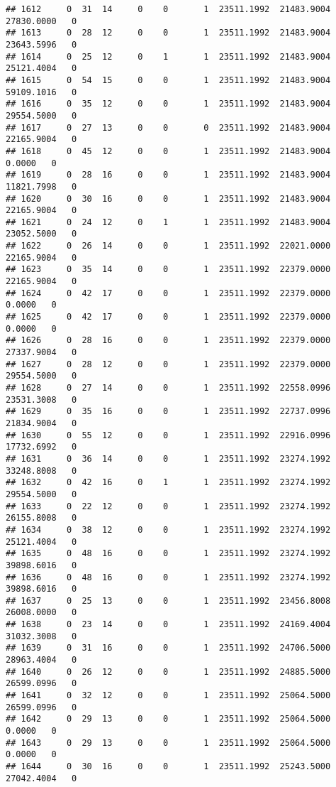 \documentclass[
]{article}
\begin{document}
\begin{enumerate}
\begin{verbatim}
## 1612     0  31  14     0    0       1  23511.1992  21483.9004  27830.0000   0
## 1613     0  28  12     0    0       1  23511.1992  21483.9004  23643.5996   0
## 1614     0  25  12     0    1       1  23511.1992  21483.9004  25121.4004   0
## 1615     0  54  15     0    0       1  23511.1992  21483.9004  59109.1016   0
## 1616     0  35  12     0    0       1  23511.1992  21483.9004  29554.5000   0
## 1617     0  27  13     0    0       0  23511.1992  21483.9004  22165.9004   0
## 1618     0  45  12     0    0       1  23511.1992  21483.9004      0.0000   0
## 1619     0  28  16     0    0       1  23511.1992  21483.9004  11821.7998   0
## 1620     0  30  16     0    0       1  23511.1992  21483.9004  22165.9004   0
## 1621     0  24  12     0    1       1  23511.1992  21483.9004  23052.5000   0
## 1622     0  26  14     0    0       1  23511.1992  22021.0000  22165.9004   0
## 1623     0  35  14     0    0       1  23511.1992  22379.0000  22165.9004   0
## 1624     0  42  17     0    0       1  23511.1992  22379.0000      0.0000   0
## 1625     0  42  17     0    0       1  23511.1992  22379.0000      0.0000   0
## 1626     0  28  16     0    0       1  23511.1992  22379.0000  27337.9004   0
## 1627     0  28  12     0    0       1  23511.1992  22379.0000  29554.5000   0
## 1628     0  27  14     0    0       1  23511.1992  22558.0996  23531.3008   0
## 1629     0  35  16     0    0       1  23511.1992  22737.0996  21834.9004   0
## 1630     0  55  12     0    0       1  23511.1992  22916.0996  17732.6992   0
## 1631     0  36  14     0    0       1  23511.1992  23274.1992  33248.8008   0
## 1632     0  42  16     0    1       1  23511.1992  23274.1992  29554.5000   0
## 1633     0  22  12     0    0       1  23511.1992  23274.1992  26155.8008   0
## 1634     0  38  12     0    0       1  23511.1992  23274.1992  25121.4004   0
## 1635     0  48  16     0    0       1  23511.1992  23274.1992  39898.6016   0
## 1636     0  48  16     0    0       1  23511.1992  23274.1992  39898.6016   0
## 1637     0  25  13     0    0       1  23511.1992  23456.8008  26008.0000   0
## 1638     0  23  14     0    0       1  23511.1992  24169.4004  31032.3008   0
## 1639     0  31  16     0    0       1  23511.1992  24706.5000  28963.4004   0
## 1640     0  26  12     0    0       1  23511.1992  24885.5000  26599.0996   0
## 1641     0  32  12     0    0       1  23511.1992  25064.5000  26599.0996   0
## 1642     0  29  13     0    0       1  23511.1992  25064.5000      0.0000   0
## 1643     0  29  13     0    0       1  23511.1992  25064.5000      0.0000   0
## 1644     0  30  16     0    0       1  23511.1992  25243.5000  27042.4004   0

\end{verbatim}
\end{enumerate}
\end{document}
